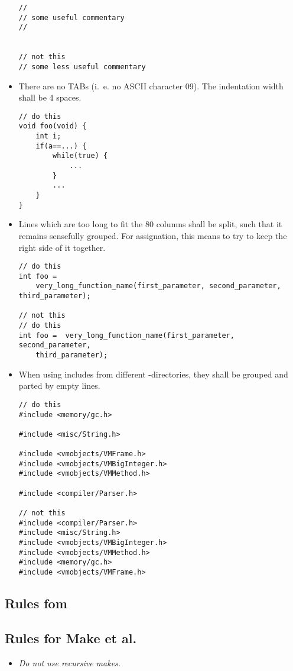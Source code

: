 \begin{itemize}
\begin{lstlisting}
//
// some useful commentary
//


// not this
// some less useful commentary
\end{lstlisting}
\item There are no TABs (i.~e. no ASCII character 09). The indentation
  width shall be 4 spaces.
\begin{lstlisting}[showspaces]
// do this
void foo(void) {
    int i;
    if(a==...) {
        while(true) {
            ...
        }
        ...
    }
}
\end{lstlisting}

\item Lines which are too long to fit the 80 columns shall be split, such
  that it remains sensefully grouped. For assignation, this means to try
  to keep the right side of it together.
  \begin{lstlisting}
// do this
int foo =
    very_long_function_name(first_parameter, second_parameter, third_parameter);

// not this
// do this
int foo =  very_long_function_name(first_parameter, second_parameter,
    third_parameter);
  \end{lstlisting}
\item When using includes from different \CSOM-directories, they shall
  be grouped and parted by empty lines.
  \begin{lstlisting}
// do this
#include <memory/gc.h>

#include <misc/String.h>

#include <vmobjects/VMFrame.h>
#include <vmobjects/VMBigInteger.h>
#include <vmobjects/VMMethod.h>

#include <compiler/Parser.h>

// not this
#include <compiler/Parser.h>
#include <misc/String.h>
#include <vmobjects/VMBigInteger.h>
#include <vmobjects/VMMethod.h>
#include <memory/gc.h>
#include <vmobjects/VMFrame.h>
\end{lstlisting}
\end{itemize}

\subsection{Rules fom \SOM}
\label{sec:rules-fom-som}

\subsection{Rules for Make et al.}
\label{sec:rules-make-et}

\begin{itemize}
\item \emph{Do not use recursive makes.}
\end{itemize}